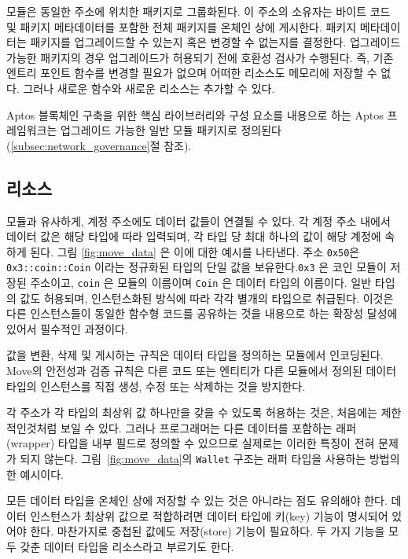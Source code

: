 \documentclass{article}
\begin{document}
모듈은 동일한 주소에 위치한 패키지로 그룹화된다. 이 주소의 소유자는 바이트 코드 및 패키지 메타데이터를 포함한 전체 패키지를 온체인 상에 게시한다. 패키지 메타데이터는 패키지를 업그레이드할 수 있는지 혹은 변경할 수 없는지를 결정한다. 업그레이드 가능한 패키지의 경우 업그레이드가 허용되기 전에 호환성 검사가 수행된다. 즉, 기존 엔트리 포인트 함수를 변경할 필요가 없으며 어떠한 리소스도 메모리에 저장할 수 없다. 그러나 새로운 함수와 새로운 리소스는 추가할 수 있다.

Aptos 블록체인 구축을 위한 핵심 라이브러리와 구성 요소를 내용으로 하는 Aptos 프레임워크는 업그레이드 가능한 일반 모듈 패키지로 정의된다(\ref{subsec:network_governance}절 참조).

\subsection{리소스} 
\label{subsec:resources}

모듈과 유사하게, 계정 주소에도 데이터 값들이 연결될 수 있다. 각 계정 주소 내에서 데이터 값은 해당 타입에 따라 입력되며, 각 타입 당 최대 하나의 값이 해당 계정에 속하게 된다. 그림 \ref{fig:move_data} 은 이에 대한 예시를 나타낸다. 주소 \texttt{0x50}은 \texttt{0x3::coin::Coin} 이라는 정규화된 타입의 단일 값을 보유한다.\texttt{0x3} 은 코인 모듈이 저장된 주소이고, \texttt{coin} 은 모듈의 이름이며 \texttt{Coin} 은 데이터 타입의 이름이다. 일반 타입의 값도 허용되며, 인스턴스화된 방식에 따라 각각 별개의 타입으로 취급된다. 이것은 다른 인스턴스들이 동일한 함수형 코드를 공유하는 것을 내용으로 하는 확장성 달성에 있어서 필수적인 과정이다.

값을 변환, 삭제 및 게시하는 규칙은 데이터 타입을 정의하는 모듈에서 인코딩된다. Move의 안전성과 검증 규칙은 다른 코드 또는 엔티티가 다른 모듈에서 정의된 데이터 타입의 인스턴스를 직접 생성, 수정 또는 삭제하는 것을 방지한다.

각 주소가 각 타입의 최상위 값 하나만을 갖을 수 있도록 허용하는 것은, 처음에는 제한적인것처럼 보일 수 있다. 그러나 프로그래머는 다른 데이터를 포함하는 래퍼(wrapper) 타입을 내부 필드로 정의할 수 있으므로 실제로는 이러한 특징이 전혀 문제가 되지 않는다. 그림~\ref{fig:move_data}의 \texttt{Wallet} 구조는 래퍼 타입을 사용하는 방법의 한 예시이다.

모든 데이터 타입을 온체인 상에 저장할 수 있는 것은 아니라는 점도 유의해야 한다. 데이터 인스턴스가 최상위 값으로 적합하려면 데이터 타입에 키(key) 기능이 명시되어 있어야 한다. 마찬가지로 중첩된 값에도 저장(store) 기능이 필요하다. 두 가지 기능을 모두 갖춘 데이터 타입을 리소스라고 부르기도 한다.
\end{document}
